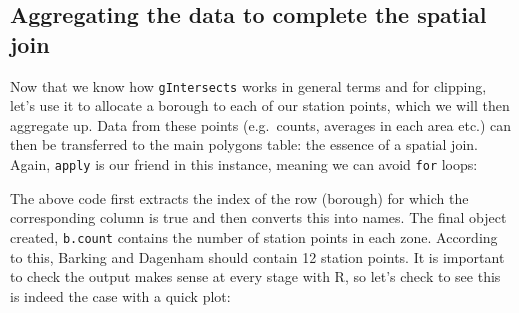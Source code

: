 \documentclass[]{article}
\newenvironment{Shaded}{}{}
\newcommand{\KeywordTok}[1]{\textcolor[rgb]{0.00,0.44,0.13}{\textbf{{#1}}}}
\newcommand{\DataTypeTok}[1]{\textcolor[rgb]{0.56,0.13,0.00}{{#1}}}
\newcommand{\DecValTok}[1]{\textcolor[rgb]{0.25,0.63,0.44}{{#1}}}
\newcommand{\CommentTok}[1]{\textcolor[rgb]{0.38,0.63,0.69}{\textit{{#1}}}}
\newcommand{\NormalTok}[1]{{#1}}
\begin{document}
\subsection{Aggregating the data to complete the spatial join}

Now that we know how \texttt{gIntersects} works in general terms and for
clipping, let's use it to allocate a borough to each of our station
points, which we will then aggregate up. Data from these points
(e.g.~counts, averages in each area etc.) can then be transferred to the
main polygons table: the essence of a spatial join. Again,
\texttt{apply} is our friend in this instance, meaning we can avoid
\texttt{for} loops:

\begin{Shaded}
\end{Shaded}
The above code first extracts the index of the row (borough) for which
the corresponding column is true and then converts this into names. The
final object created, \texttt{b.count} contains the number of station
points in each zone. According to this, Barking and Dagenham should
contain 12 station points. It is important to check the output makes
sense at every stage with R, so let's check to see this is indeed the
case with a quick plot:
\end{document}
